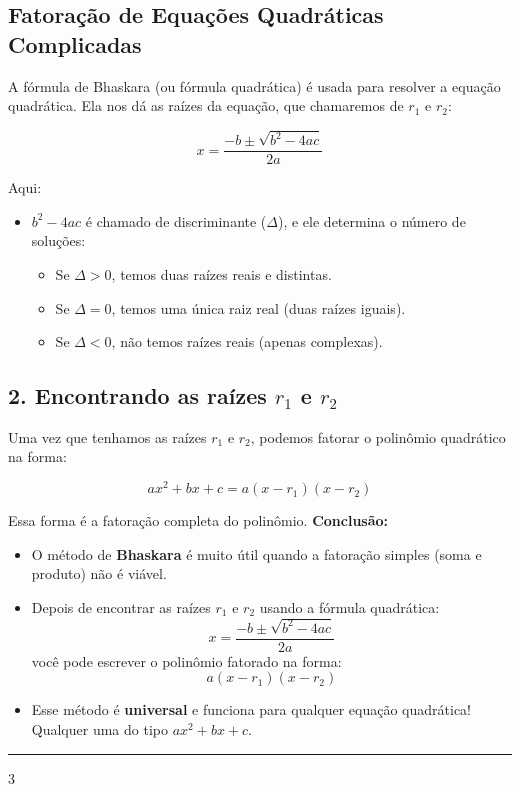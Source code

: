 \documentclass{article}
\begin{document}
\subsection{Fatoração de Equações Quadráticas Complicadas}
A fórmula de Bhaskara (ou fórmula quadrática) é usada para resolver a equação quadrática. Ela nos dá as raízes da equação, que chamaremos de \(r_1\) e \(r_2\):

\[
x = \frac{-b \pm \sqrt{b^2 - 4ac}}{2a}
\]

Aqui:
\begin{itemize}
    \item \(b^2 - 4ac\) é chamado de discriminante (\(\Delta\)), e ele determina o número de soluções:
    \begin{itemize}
        \item Se \(\Delta > 0\), temos duas raízes reais e distintas.
        \item Se \(\Delta = 0\), temos uma única raiz real (duas raízes iguais).
        \item Se \(\Delta < 0\), não temos raízes reais (apenas complexas).
    \end{itemize}
\end{itemize}

\subsection*{2. Encontrando as raízes \(r_1\) e \(r_2\)}

Uma vez que tenhamos as raízes \(r_1\) e \(r_2\), podemos fatorar o polinômio quadrático na forma:

\[
ax^2 + bx + c = a(x - r_1)(x - r_2)
\]

Essa forma é a fatoração completa do polinômio.
\textbf{Conclusão:}

\begin{itemize}
    \item O método de \textbf{Bhaskara} é muito útil quando a fatoração simples (soma e produto) não é viável.

    \item Depois de encontrar as raízes \(r_1\) e \(r_2\) usando a fórmula quadrática:
    \[
    x = \frac{{-b \pm \sqrt{{b^2 - 4ac}}}}{2a}
    \]
    você pode escrever o polinômio fatorado na forma:
    \[
    a(x - r_1)(x - r_2)
    \]

    \item Esse método é \textbf{universal} e funciona para qualquer equação quadrática! Qualquer uma do tipo \(ax^2 + bx + c\).
    
\end{itemize}
\vspace{15pt}
\hrule3
\end{document}
